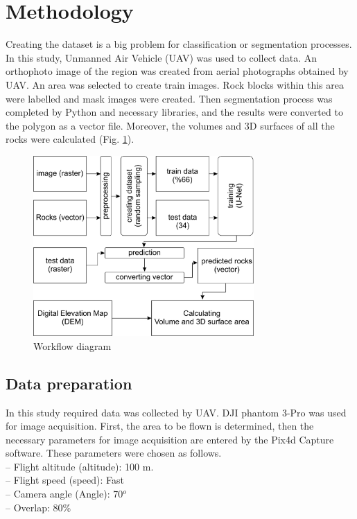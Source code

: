 \documentclass[a4paper,fleqn]{cas-sc}
\begin{document}
\section{Methodology}
Creating the dataset is a big problem for classification or segmentation processes. In this study, Unmanned Air Vehicle (UAV) was used to collect data. An orthophoto image of the region was created from aerial photographs obtained by UAV. An area was selected to create train images. Rock blocks within this area were labelled and mask images were created. Then segmentation process was completed by Python and necessary libraries, and the results were converted to the polygon as a vector file. Moreover, the volumes and 3D surfaces of all the rocks were calculated (Fig. \ref{fig:Figure3}).

\begin{figure}
	\centering
	\includegraphics[width=0.75\textwidth]{figures/fig3.jpg}
	\caption{ Workflow diagram}
	\label{fig:Figure3}
\end{figure}
\subsection{Data preparation}
In this study required data was collected by UAV. DJI phantom 3-Pro was used for image acquisition. First, the area to be flown is determined, then the necessary parameters for image acquisition are entered by the Pix4d Capture software. These parameters were chosen as follows.\\
– Flight altitude (altitude): 100 m.\\
– Flight speed (speed): Fast\\
– Camera angle (Angle): 70$^o$\\
– Overlap: 80\%\\
\end{document}
